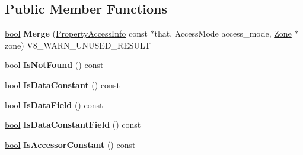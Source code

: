 \subsection*{Public Member Functions}
\begin{DoxyCompactItemize}
\item 
\mbox{\label{classv8_1_1internal_1_1compiler_1_1PropertyAccessInfo_a67278c1fd0a6091c44f3be6db094cb16}} 
\mbox{\hyperlink{classbool}{bool}} {\bfseries Merge} (\mbox{\hyperlink{classv8_1_1internal_1_1compiler_1_1PropertyAccessInfo}{Property\+Access\+Info}} const $\ast$that, Access\+Mode access\+\_\+mode, \mbox{\hyperlink{classv8_1_1internal_1_1Zone}{Zone}} $\ast$zone) V8\+\_\+\+W\+A\+R\+N\+\_\+\+U\+N\+U\+S\+E\+D\+\_\+\+R\+E\+S\+U\+LT
\item 
\mbox{\label{classv8_1_1internal_1_1compiler_1_1PropertyAccessInfo_ac8207b49759f075a32e4fc56781fbf44}} 
\mbox{\hyperlink{classbool}{bool}} {\bfseries Is\+Not\+Found} () const
\item 
\mbox{\label{classv8_1_1internal_1_1compiler_1_1PropertyAccessInfo_a33e86348292ec2935eb1213b2ab57cc9}} 
\mbox{\hyperlink{classbool}{bool}} {\bfseries Is\+Data\+Constant} () const
\item 
\mbox{\label{classv8_1_1internal_1_1compiler_1_1PropertyAccessInfo_aac5aca51cfc218e1a5a48dc99d07ee00}} 
\mbox{\hyperlink{classbool}{bool}} {\bfseries Is\+Data\+Field} () const
\item 
\mbox{\label{classv8_1_1internal_1_1compiler_1_1PropertyAccessInfo_add09d47664bdd26451ca64874aaaafa1}} 
\mbox{\hyperlink{classbool}{bool}} {\bfseries Is\+Data\+Constant\+Field} () const
\item 
\mbox{\label{classv8_1_1internal_1_1compiler_1_1PropertyAccessInfo_a65e34d25ce2ee8a6a3acc0bfc1b77e79}} 
\mbox{\hyperlink{classbool}{bool}} {\bfseries Is\+Accessor\+Constant} () const
\item 
\mbox{\label{classv8_1_1internal_1_1compiler_1_1PropertyAccessInfo_aceecae10bafe847390201292aba4d8be}} 

\end{DoxyCompactItemize}
